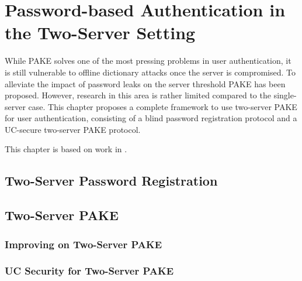 \chapter{Password-based Authentication in the Two-Server Setting}

While \ac{PAKE} solves one of the most pressing problems in user authentication, it is still vulnerable to offline dictionary attacks once the server is compromised.
To alleviate the impact of password leaks on the server threshold \ac{PAKE} has been proposed.
However, research in this area is rather limited compared to the single-server case.
This chapter proposes a complete framework to use two-server \ac{PAKE} for user authentication, consisting of a blind password registration protocol and a \ac{UC}-secure two-server \ac{PAKE} protocol.

This chapter is based on work in \cite{KieferM14b,KieferM15b,KieferM15c}.

\section{Two-Server Password Registration}



\section{Two-Server PAKE}

\subsection{Improving on Two-Server PAKE}

\subsection{UC Security for Two-Server PAKE}
